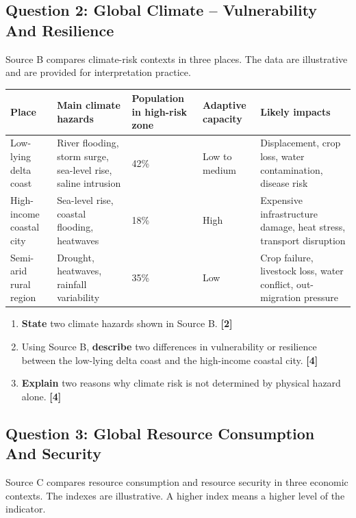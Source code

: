 \documentclass[11pt,a4paper]{article}
\newcommand{\exam}[1]{\textcolor{AccentTeal}{\textbf{#1}}}
\newcommand{\markpts}[1]{\hfill\textbf{[#1]}}
\begin{document}
\subsection{Question 2: Global Climate -- Vulnerability And Resilience}

Source B compares climate-risk contexts in three places. The data are
illustrative and are provided for interpretation practice.

\begin{tabularx}{\textwidth}{L{0.2\textwidth}Y C{0.14\textwidth}C{0.18\textwidth}Y}
\toprule
\textbf{Place} & \textbf{Main climate hazards} & \textbf{Population in high-risk zone} &
\textbf{Adaptive capacity} & \textbf{Likely impacts} \\
\midrule
Low-lying delta coast & River flooding, storm surge, sea-level rise, saline
intrusion & 42\% & Low to medium & Displacement, crop loss, water
contamination, disease risk \\
High-income coastal city & Sea-level rise, coastal flooding, heatwaves & 18\%
& High & Expensive infrastructure damage, heat stress, transport disruption \\
Semi-arid rural region & Drought, heatwaves, rainfall variability & 35\% &
Low & Crop failure, livestock loss, water conflict, out-migration pressure \\
\bottomrule
\end{tabularx}

\begin{enumerate}[label=\textbf{2(\alph*)}]
  \item \exam{State} two climate hazards shown in Source B. \markpts{2}

  \item Using Source B, \exam{describe} two differences in vulnerability or
  resilience between the low-lying delta coast and the high-income coastal
  city. \markpts{4}

  \item \exam{Explain} two reasons why climate risk is not determined by
  physical hazard alone. \markpts{4}
\end{enumerate}

\subsection{Question 3: Global Resource Consumption And Security}

Source C compares resource consumption and resource security in three economic
contexts. The indexes are illustrative. A higher index means a higher level of
the indicator.
\end{document}
